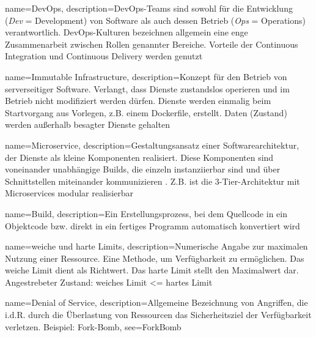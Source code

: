 {%
  name={DevOps},
  description={DevOps-Teams sind sowohl für die Entwicklung (\emph{Dev} = Development) von Software als auch dessen Betrieb (\emph{Ops} = Operations) verantwortlich. DevOps-Kulturen bezeichnen allgemein eine enge Zusammenarbeit zwischen Rollen genannter Bereiche. Vorteile der Continuous Integration und Continuous Delivery werden genutzt \cite{http://martinfowler.com/bliki/DevOpsCulture.html}}
}

{%
  name={Immutable Infrastructure},
  description={Konzept für den Betrieb von serverseitiger Software. Verlangt, dass Dienste zustandslos operieren und im Betrieb nicht modifiziert werden dürfen. Dienste werden einmalig beim Startvorgang aus Vorlegen, z.B. einem Dockerfile, erstellt. Daten (Zustand) werden außerhalb besagter Dienste gehalten \cite{unikernelMeetsDocker}\cite{immutableInfrastructure}}
}

{%
  name={Microservice},
  description={Gestaltungsansatz einer Softwarearchitektur, der Dienste als kleine Komponenten realisiert. Diese Komponenten sind voneinander unabhängige Builds, die einzeln instanziierbar sind und über Schnittstellen miteinander kommunizieren . Z.B. ist die 3-Tier-Architektur mit Microservices modular realisierbar \cite{http://martinfowler.com/articles/microservices.html}}
}

{%
  name={Build},
  description={Ein Erstellungsprozess, bei dem Quellcode in ein Objektcode bzw. direkt in ein fertiges Programm automatisch konvertiert wird}
}

{%
  name={weiche und harte Limits},
  description={Numerische Angabe zur maximalen Nutzung einer Ressource. Eine Methode, um Verfügbarkeit zu ermöglichen. Das weiche Limit dient als Richtwert. Das harte Limit stellt den Maximalwert dar. Angestrebeter Zustand: weiches Limit \textless= hartes Limit}
}

{%
  name={Denial of Service},
  description={Allgemeine Bezeichnung von Angriffen, die i.d.R. durch die Überlastung von Ressourcen das Sicherheitsziel der Verfügbarkeit verletzen. Beispiel: Fork-Bomb},
  see={ForkBomb}
}

